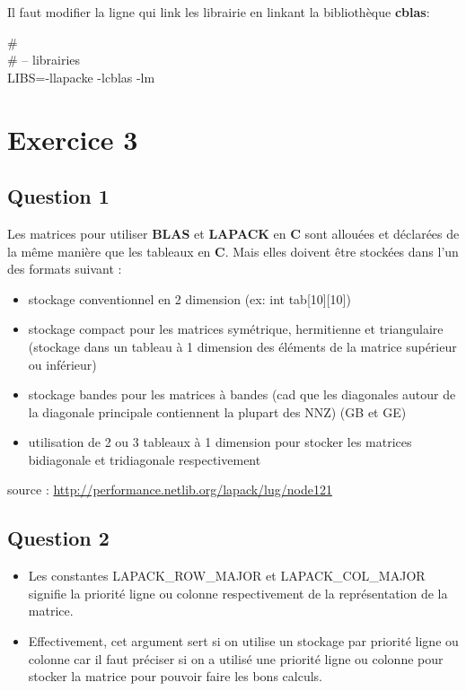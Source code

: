 \documentclass[11pt]{article}
\begin{document}
Il faut modifier la ligne qui link les librairie en linkant la
bibliothèque \textbf{cblas}:

\# \\
\# -- librairies \\
LIBS=-llapacke -lcblas -lm \\

\section{Exercice 3}
\subsection{Question 1}

Les matrices pour utiliser \textbf{BLAS} et \textbf{LAPACK} en \textbf{C} sont allouées
et déclarées de la même manière que les tableaux en \textbf{C}. Mais elles
doivent être stockées dans l'un des formats suivant :

\begin{itemize}
\item stockage conventionnel en 2 dimension (ex: int tab[10][10])
\item stockage compact pour les matrices symétrique, hermitienne et
  triangulaire (stockage dans un tableau à 1 dimension des éléments
  de la matrice supérieur ou inférieur)
\item stockage bandes pour les matrices à bandes (cad que les
  diagonales autour de la diagonale principale contiennent la
  plupart des NNZ) (GB et GE)
\item utilisation de 2 ou 3 tableaux à 1 dimension pour stocker les
  matrices bidiagonale et tridiagonale respectivement
\end{itemize}

source : \url{http://performance.netlib.org/lapack/lug/node121}

\subsection{Question 2}

\begin{itemize}
\item Les constantes LAPACK\_ROW\_MAJOR et LAPACK\_COL\_MAJOR
  signifie la priorité ligne ou colonne respectivement de la
  représentation de la matrice.
\item Effectivement, cet argument sert si on utilise un stockage
  par priorité ligne ou colonne car il faut préciser si on a utilisé
  une priorité ligne ou colonne pour stocker la matrice pour pouvoir
  faire les bons calculs.
\end{itemize}
\end{document}
